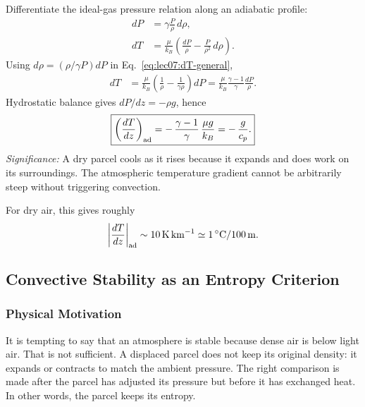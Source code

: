 Differentiate the ideal-gas pressure relation along an adiabatic profile:
\begin{align}
    dP &= \gamma\frac{P}{\rho}\,d\rho ,
    \label{eq:lec07:adiabatic-dP}\\
    dT &= \frac{\mu}{k_B}\left(\frac{dP}{\rho}
    - \frac{P}{\rho^2}\,d\rho\right).
    \label{eq:lec07:dT-general}
\end{align}
Using $d\rho = (\rho/\gamma P)dP$ in Eq.~\eqref{eq:lec07:dT-general},
\begin{align}
    dT
    &= \frac{\mu}{k_B}\left(\frac{1}{\rho}
    - \frac{1}{\gamma\rho}\right)dP
    = \frac{\mu}{k_B}\frac{\gamma-1}{\gamma}\frac{dP}{\rho}.
    \label{eq:lec07:dT-adiabatic}
\end{align}
Hydrostatic balance gives $dP/dz=-\rho g$, hence
\begin{equation}
    \boxed{
    \left(\frac{dT}{dz}\right)_{\rm ad}
    = -\,\frac{\gamma-1}{\gamma}\,\frac{\mu g}{k_B}
    = -\,\frac{g}{c_p}.
    }
    \label{eq:lec07:dry-adiabatic-lapse}
\end{equation}
\textit{Significance:} A dry parcel cools as it rises because it expands and
does work on its surroundings. The atmospheric temperature gradient cannot be
arbitrarily steep without triggering convection.

For dry air, this gives roughly
\begin{equation}
    \left|\frac{dT}{dz}\right|_{\rm ad}
    \sim 10\,\si{K\,km^{-1}}
    \simeq 1\,^\circ\mathrm{C}/100\,\si{m}.
    \label{eq:lec07:dry-lapse-number}
\end{equation}


\subsection{Convective Stability as an Entropy Criterion}
\label{sec:lec07:convective-stability}

\subsubsection*{Physical Motivation}
It is tempting to say that an atmosphere is stable because dense air is below
light air. That is not sufficient. A displaced parcel does not keep its
original density: it expands or contracts to match the ambient pressure. The
right comparison is made after the parcel has adjusted its pressure but before
it has exchanged heat. In other words, the parcel keeps its entropy.

